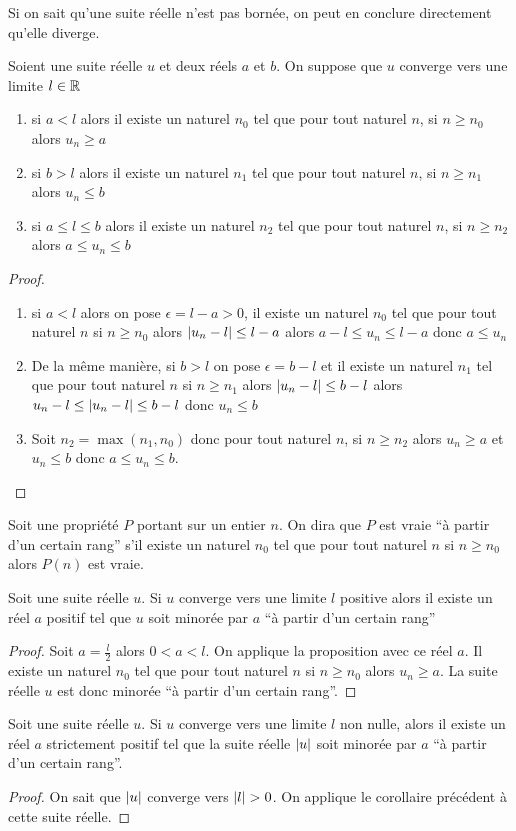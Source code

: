 Si on sait qu'une suite réelle n'est pas bornée, on peut en conclure directement qu'elle diverge.
\begin{prop}
  Soient une suite réelle $u$ et deux réels $a$ et $b$. On suppose que $u$ converge vers une limite $l\in\mathbb{R}$
  \begin{enumerate}
  \item si $a<l$ alors il existe un naturel $n_0$ tel que pour tout naturel $n$, si $n\geq n_0$ alors $u_n\geq a$
  \item si $b>l$ alors il existe un naturel $n_1$ tel que pour tout naturel $n$, si $n\geq n_1$ alors $u_n\leq b$
  \item si $a\leq l\leq b$ alors il existe un naturel $n_2$ tel que pour tout naturel $n$, si $n\geq n_2$ alors $a \leq u_n \leq b$
  \end{enumerate}
\end{prop}
\begin{proof}
  \begin{enumerate}
  \item si $a<l$ alors on pose $\epsilon=l-a>0$, il existe un naturel $n_0$ tel que pour tout naturel $n$ si $n \geq n_0$ alors $\left\lvert u_n-l\right\rvert\leq l-a$ alors $a-l \leq u_n \leq l-a$ donc $a \leq u_n$
  \item De la même manière, si $b>l$ on pose $\epsilon=b-l$ et il existe un naturel $n_1$ tel que pour tout naturel $n$ si $n \geq n_1$ alors $\left\lvert u_n-l\right\rvert \leq b-l$ alors $u_n-l \leq \left\lvert u_n-l\right\rvert\leq b-l$ donc $u_n \leq b$
  \item Soit $n_2=\max(n_1,n_0)$ donc pour tout naturel $n$, si $n \geq n_2$ alors $u_n \geq a$ et $u_n \leq b$ donc $a \leq u_n \leq b$.
  \end{enumerate}
\end{proof}
\begin{defdef}
  Soit une propriété $P$ portant sur un entier $n$. On dira que $P$ est vraie ``à partir d'un certain rang'' s'il existe un naturel $n_0$ tel que pour tout naturel $n$ si $n\geq n_0$ alors $P(n)$ est vraie.
\end{defdef}
\begin{cor}
  Soit une suite réelle $u$. Si $u$ converge vers une limite $l$ positive alors il existe un réel $a$ positif tel que $u$ soit minorée par $a$ ``à partir d'un certain rang''
\end{cor}
\begin{proof}
  Soit $a=\frac{l}{2}$ alors $0<a<l$. On applique la proposition avec ce réel $a$. Il existe un naturel $n_0$ tel que pour tout naturel $n$ si $n \geq n_0$ alors $u_n \geq a$. La suite réelle $u$ est donc minorée ``à partir d'un certain rang''.
\end{proof}
\begin{cor}
  Soit une suite réelle $u$. Si $u$ converge vers une limite $l$ non nulle, alors il existe un réel $a$ strictement positif tel que la suite réelle $\left\lvert u\right\rvert$ soit minorée par $a$ ``à partir d'un certain rang''.
\end{cor}
\begin{proof}
  On sait que $\left\lvert u\right\rvert$  converge vers $\left\lvert l\right\rvert>0$. On applique le corollaire précédent à cette suite réelle.
\end{proof}

